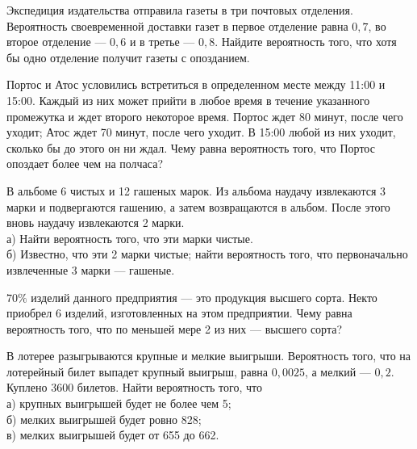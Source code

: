 \newpage\setcounter{zad}{0}



\begin{zkrW}{20}\noindent 
	Экспедиция издательства отправила газеты в три почтовых отделения. Вероятность своевременной доставки газет в первое отделение равна $0{,}7$, во второе отделение --- $0{,}6$ и в третье --- $0{,}8$. Найдите вероятность того, что хотя бы одно отделение получит газеты с опозданием.
 
\end{zkrW}

\begin{zkrW}{20}\noindent 
	Портос и Атос условились встретиться в определенном месте между 11:00 и 15:00. Каждый из них может прийти в любое время в течение указанного промежутка и ждет второго некоторое время. Портос ждет 80 минут, после чего уходит; Атос ждет 70 минут, после чего уходит. В 15:00 любой из них уходит, сколько бы до этого он ни ждал. Чему равна вероятность того, что Портос опоздает более чем на полчаса?
 
\end{zkrW}

\begin{zkrW}{20}\noindent 
	В альбоме 6 чистых и 12 гашеных марок. Из альбома наудачу извлекаются 3 марки и подвергаются гашению, а затем возвращаются в альбом. После этого вновь наудачу извлекаются 2 марки. \\ \indent а) Найти вероятность того, что эти марки чистые. \\ \indent б) Известно, что эти 2 марки чистые; найти вероятность того, что первоначально извлеченные 3 марки --- гашеные.
 
\end{zkrW}

\begin{zkrW}{20}\noindent 
	$70\%$ изделий данного предприятия — это продукция высшего сорта. Некто приобрел 6 изделий, изготовленных на этом предприятии. Чему равна вероятность того, что по меньшей мере 2 из них — высшего сорта?
 
\end{zkrW}

\begin{zkrW}{20}\noindent 
	В лотерее разыгрываются крупные и мелкие выигрыши. Вероятность того, что на лотерейный билет выпадет крупный выигрыш, равна $0{,}0025$, а мелкий --- $0{,}2$. Куплено 3600 билетов. Найти вероятность того, что \\ \indent а) крупных выигрышей будет не более чем 5; \\ \indent б) мелких выигрышей будет ровно 828; \\ \indent в) мелких выигрышей будет от 655 до 662.
 
\end{zkrW}


